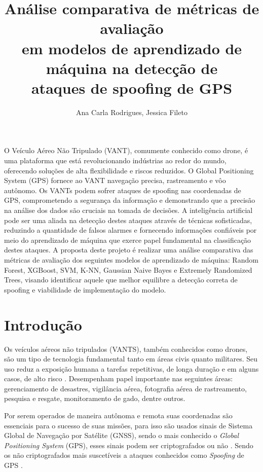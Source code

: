 \documentclass[12pt]{article}
\title{Análise comparativa de métricas de avaliação\\
em modelos de aprendizado de máquina na detecção de\\
ataques de spoofing de GPS
}
\author{Ana Carla Rodrigues\inst{1}, Jessica Fileto\inst{1}}
\begin{document}
\maketitle
     
\begin{resumo} 
O Veículo Aéreo Não Tripulado (VANT), comumente conhecido como drone, é uma
plataforma que está revolucionando indústrias ao redor do mundo, oferecendo 
soluções de alta flexibilidade e riscos reduzidos. O Global Positioning System 
(GPS) fornece ao VANT navegação precisa, rastreamento e vôo autônomo. Os VANTs 
podem sofrer ataques de spoofing nas coordenadas de GPS, comprometendo a 
segurança da informação e demonstrando que a precisão na análise dos dados são 
cruciais na tomada de decisões. A inteligência artificial pode ser uma aliada 
na detecção destes ataques através de técnicas sofisticadas, reduzindo a 
quantidade de falsos alarmes e fornecendo informações confiáveis por meio do 
aprendizado de máquina que exerce papel fundamental na classificação destes 
ataques. A proposta deste projeto é realizar uma análise comparativa das 
métricas de avaliação dos seguintes modelos de aprendizado de máquina:
Random Forest, XGBoost, SVM, K-NN,
Gaussian Naive Bayes e Extremely Randomized Trees,
visando identificar aquele que melhor equilibre a detecção correta
de spoofing e viabilidade de implementação do modelo.
\end{resumo}

\section{Introdução}

Os veículos aéreos não tripulados (VANTS), também conhecidos como drones,
são um tipo de tecnologia fundamental tanto em áreas civis quanto militares.
Seu uso reduz a exposição humana a tarefas repetitivas, de longa duração
e em alguns casos, de alto risco \cite{dialogos}.
Desempenham papel importante nas seguintes áreas: gerenciamento de desastres,
vigilância aérea, fotografia aérea de rastreamento, pesquisa e resgate,
monitoramento de gado, dentre outros. \cite{titounaLightweightSecurityTechnique2021} 

Por serem operados de maneira autônoma e remota suas coordenadas são essenciais
para o sucesso de suas missões, para isso são usados sinais
de Sistema Global de Navegação por Satélite (GNSS),
sendo o mais conhecido o \textit{Global Positioning System} (GPS),
esses sinais podem ser criptografados ou não \cite {lester}.
Sendo os não criptografados mais suscetíveis a ataques conhecidos como
\textit{Spoofing} de GPS \cite{srinivasansGPSSpoofingDetection2023}.
\end{document}
